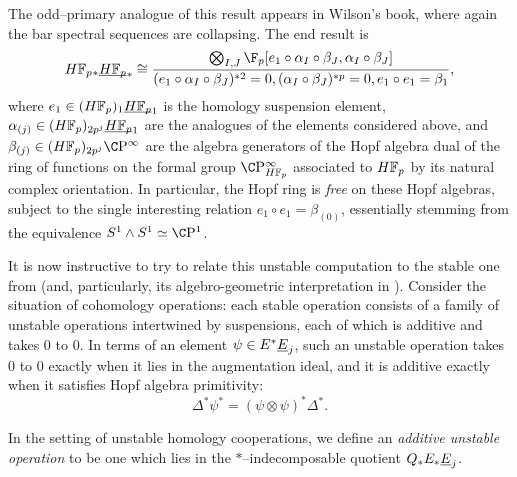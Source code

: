 \begin{remark}
The odd--primary analogue of this result appears in Wilson's book, where again the bar spectral sequences are collapsing.  The end result is \[\HFp_* \OS{\HFp}{*} \cong \frac{\bigotimes_{I, J} \F_p[e_1 \circ \alpha_I \circ \beta_J, \alpha_I \circ \beta_J]}{(e_1 \circ \alpha_I \circ \beta_J)^{\ast 2} = 0, (\alpha_I \circ \beta_J)^{\ast p} = 0, e_1 \circ e_1 = \beta_1},\] where $e_1 \in (\HFp)_1 \OS{\HFp}{1}$ is the homology suspension element, $\alpha_{(j)} \in (\HFp)_{2p^j} \OS{\HFp}{1}$ are the analogues of the elements considered above, and $\beta_{(j)} \in (\HFp)_{2p^j} \CP^\infty$ are the algebra generators of the Hopf algebra dual of the ring of functions on the formal group $\CP^\infty_{\HFp}$ associated to $\HFp$ by its natural complex orientation.  In particular, the Hopf ring is \emph{free} on these Hopf algebras, subject to the single interesting relation $e_1 \circ e_1 = \beta_{(0)}$, essentially stemming from the equivalence $S^1 \sm S^1 \simeq \CP^1$.
\end{remark}

It is now instructive to try to relate this unstable computation to the stable one from  (and, particularly, its algebro-geometric interpretation in ).  Consider the situation of cohomology operations: each stable operation consists of a family of unstable operations intertwined by suspensions, each of which is additive and takes $0$ to $0$.  In terms of an element $\psi \in E^* \underline{\smash{E}}_{j}$, such an unstable operation takes $0$ to $0$ exactly when it lies in the augmentation ideal, and it is additive exactly when it satisfies Hopf algebra primitivity: \[\Delta^* \psi^* = (\psi \otimes \psi)^* \Delta^*.\]
\begin{definition}
In the setting of unstable homology cooperations, we define an \textit{additive unstable operation} to be one which lies in the $\ast$--indecomposable quotient $Q_* E_* \underline{\smash{E}}_{j}$.
\end{definition}

